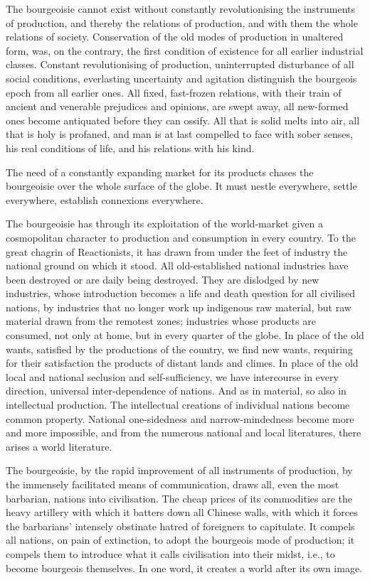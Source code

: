 \documentclass[11pt]{book}
\begin{document}
The bourgeoisie cannot exist without constantly revolutionising
the instruments of production, and thereby the relations of
production, and with them the whole relations of society.
Conservation of the old modes of production in unaltered form,
was, on the contrary, the first condition of existence for all
earlier industrial classes. Constant revolutionising of
production, uninterrupted disturbance of all social conditions,
everlasting uncertainty and agitation distinguish the bourgeois
epoch from all earlier ones. All fixed, fast-frozen relations,
with their train of ancient and venerable prejudices and
opinions, are swept away, all new-formed ones become antiquated
before they can ossify. All that is solid melts into air, all
that is holy is profaned, and man is at last compelled to face
with sober senses, his real conditions of life, and his
relations with his kind.

The need of a constantly expanding market for its products
chases the bourgeoisie over the whole surface of the globe. It
must nestle everywhere, settle everywhere, establish connexions
everywhere.

The bourgeoisie has through its exploitation of the world-market
given a cosmopolitan character to production and consumption in
every country.  To the great chagrin of Reactionists, it has
drawn from under the feet of industry the national ground on
which it stood.  All old-established national industries have
been destroyed or are daily being destroyed.  They are dislodged
by new industries, whose introduction becomes a life and death
question for all civilised nations, by industries that no longer
work up indigenous raw material, but raw material drawn from the
remotest zones; industries whose products are consumed, not only
at home, but in every quarter of the globe.  In place of the old
wants, satisfied by the productions of the country, we find new
wants, requiring for their satisfaction the products of distant
lands and climes.  In place of the old local and national
seclusion and self-sufficiency, we have intercourse in every
direction, universal inter-dependence of nations.  And as in
material, so also in intellectual production.  The intellectual
creations of individual nations become common property.  National
one-sidedness and narrow-mindedness become more and more
impossible, and from the numerous national and local literatures,
there arises a world literature.

The bourgeoisie, by the rapid improvement of all instruments of
production, by the immensely facilitated means of communication,
draws all, even the most barbarian, nations into civilisation.
The cheap prices of its commodities are the heavy artillery with
which it batters down all Chinese walls, with which it forces the
barbarians' intensely obstinate hatred of foreigners to
capitulate.  It compels all nations, on pain of extinction, to
adopt the bourgeois mode of production; it compels them to
introduce what it calls civilisation into their midst, i.e., to
become bourgeois themselves.  In one word, it creates a world
after its own image.
\end{document}
